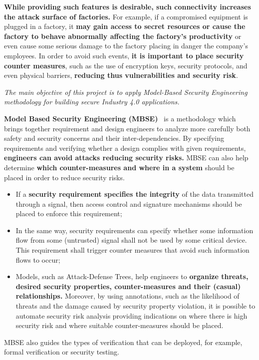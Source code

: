 \textbf{While providing such features is desirable, such connectivity increases the attack surface of factories.} For example, if a compromised equipment is plugged in a factory, it \textbf{may gain access to secret resources or cause the factory to behave abnormally affecting the factory's productivity} or even cause some serious damage to the factory placing in danger the company's employees. In order to avoid such events, \textbf{it is important to place security counter measures}, such as the use of encryption keys, security protocols, and even physical barriers, \textbf{reducing thus vulnerabilities and security risk}. 

\begin{center}
  \emph{The main objective of this project is to apply Model-Based Security Engineering methodology for building secure Industry 4.0 applications.} 
\end{center}

\textbf{Model Based Security Engineering (MBSE)}~\cite{umlsec,secureuml} is a methodology
which brings together requirement and design engineers to analyze more carefully both safety and security concerns and their inter-dependencies. By specifying requirements and verifying whether a design complies with given requirements, \textbf{engineers can avoid attacks reducing security risks.} 
MBSE can also help determine \textbf{which counter-measures and where in a system} should be placed in order to reduce security risks.  
\begin{itemize}
  \item If a \textbf{security requirement specifies the integrity} of the data transmitted through a signal, then access control and signature mechanisms should be placed to enforce this requirement;

  \item In the same way, security requirements can specify whether some information flow from some (untrusted) signal shall not be used by some critical device. This requirement shall trigger counter measures that avoid such information flows to occur;

  \item Models, such as Attack-Defense Trees, help engineers to \textbf{organize threats, desired security properties, counter-measures and their (casual) relationships.} Moreover, by using annotations, such as the likelihood of threats and the damage caused by security property violation, it is possible to automate security risk analysis providing indications on where there is high security risk and where suitable counter-measures should be placed.
\end{itemize}
MBSE also guides the types of verification that can be deployed, for example, formal verification or security testing.

